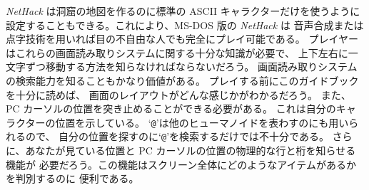 {\it NetHack\/} は洞窟の地図を作るのに標準の ASCII キャラクターだけを使うように
設定することもできる。これにより、MS-DOS 版の {\it NetHack\/} は
音声合成または点字技術を用いれば目の不自由な人でも完全にプレイ可能である。
プレイヤーはこれらの画面読み取りシステムに関する十分な知識が必要で、
上下左右に一文字ずつ移動する方法を知らなければならないだろう。
画面読み取りシステムの検索能力を知ることもかなり価値がある。
プレイする前にこのガイドブックを十分に読めば、
画面のレイアウトがどんな感じかがわかるだろう。
また、 PC カーソルの位置を突き止めることができる必要がある。
これは自分のキャラクターの位置を示している。
`{\tt @}'は他のヒューマノイドを表わすのにも用いられるので、
自分の位置を探すのに`{\tt @}'を検索するだけでは不十分である。
さらに、あなたが見ている位置と PC カーソルの位置の物理的な行と桁を知らせる機能が
必要だろう。この機能はスクリーン全体にどのようなアイテムがあるかを判別するのに
便利である。
